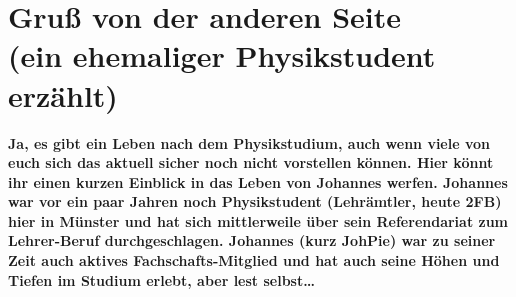 \section[Gruß von der anderen Seite (ein ehemaliger Physikstudent erzählt)]{Gruß von der anderen Seite\\(ein ehemaliger Physikstudent erzählt)}
\textbf{Ja, es gibt ein Leben nach dem Physikstudium, auch wenn viele von euch sich das aktuell sicher noch nicht vorstellen können. Hier könnt ihr einen kurzen Einblick in das Leben von Johannes werfen. Johannes war vor ein paar Jahren noch Physikstudent (Lehrämtler, heute 2FB) hier in Münster und hat sich mittlerweile über sein Referendariat zum Lehrer-Beruf durchgeschlagen. Johannes (kurz JohPie) war zu seiner Zeit auch aktives Fachschafts-Mitglied und hat auch seine Höhen und Tiefen im Studium erlebt, aber lest selbst\dots}

